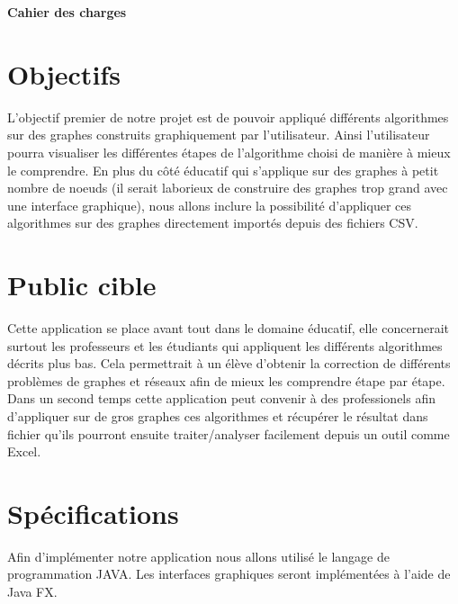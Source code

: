 \documentclass[french]{article}
\begin{document}
	\centering
	\LARGE{\textbf{Cahier des charges}}
  \large

	\justify

  \section{Objectifs}
  L'objectif premier de notre projet est de pouvoir appliqué différents algorithmes sur des graphes construits graphiquement par l'utilisateur.
  Ainsi l'utilisateur pourra visualiser les différentes étapes de l'algorithme choisi de manière à mieux le comprendre.
  En plus du côté éducatif qui s'applique sur des graphes à petit nombre de noeuds (il serait laborieux de construire des graphes trop grand avec une interface graphique),
   nous allons inclure la possibilité d'appliquer ces algorithmes sur des graphes directement importés depuis des fichiers CSV.


  \section{Public cible}
  Cette application se place avant tout dans le domaine éducatif, elle concernerait surtout les professeurs et les étudiants qui appliquent les différents algorithmes décrits plus bas.
  Cela permettrait à un élève d'obtenir la correction de différents problèmes de graphes et réseaux afin de mieux les comprendre étape par étape.
  Dans un second temps cette application peut convenir à des professionels afin d'appliquer sur de gros graphes ces algorithmes et récupérer le résultat dans fichier qu'ils pourront
  ensuite traiter/analyser facilement depuis un outil comme Excel.

	\section{Spécifications}
  Afin d'implémenter notre application nous allons utilisé le langage de programmation JAVA. Les interfaces graphiques seront implémentées à l'aide de Java FX.
\end{document}
